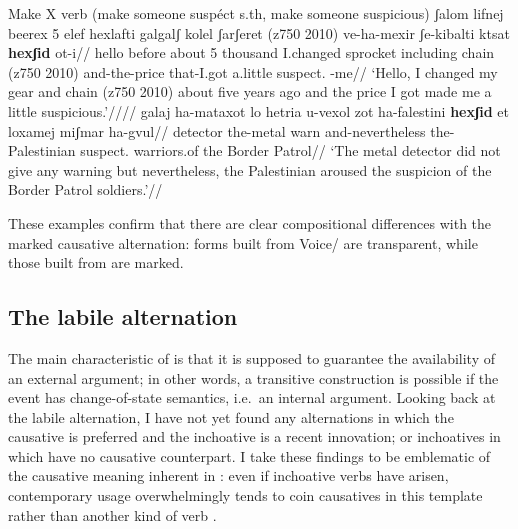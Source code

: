 \pex Make X verb (make someone suspéct s.th, make someone suspicious)
	\a \begingl
		\gla ʃalom lifnej beerex 5 elef hexlafti galgalʃ kolel ʃarʃeret (z750 2010) ve-ha-mexir ʃe-kibalti k{ts}at \textbf{hexʃid} ot-i//
		\glb hello before about 5 thousand I.changed sprocket including chain (z750 2010) and-the-price that-I.got a.little suspect. -me//
		\glft `Hello, I changed my gear and chain (z750 2010) about five years ago and the price I got made me a little suspicious.'////
	\endgl
	\a \begingl
		\gla galaj ha-mataxot lo hetria u-{vexol zot} ha-falestini \textbf{hexʃid} et loxamej {miʃmar ha-gvul}//
		\glb detector the-metal  warn and-nevertheless the-Palestinian suspect.  warriors.of {the Border Patrol}//
		\glft `The metal detector did not give any warning but nevertheless, the Palestinian aroused the suspicion of the Border Patrol soldiers.'//
	\endgl
\xe

These examples confirm that there are clear compositional differences with the marked causative alternation: forms built from Voice/{\vz} are transparent, while those built from {\vz} are marked.


%	
%	
%	
%


	\subsection{The labile alternation} \label{vd:caus:labile}
The main characteristic of {\vd} is that it is supposed to guarantee the availability of an external argument; in other words, a transitive construction is possible if the event has change-of-state semantics, i.e.~an internal argument. Looking back at the labile alternation, I have not yet found any alternations in which the causative is preferred and the inchoative is a recent innovation; or inchoatives in {\thif} which have no causative counterpart. I take these findings to be emblematic of the causative meaning inherent in {\vd}: even if inchoative verbs have arisen, contemporary usage overwhelmingly tends to coin causatives in this template rather than another kind of verb \citep{laks14}.

